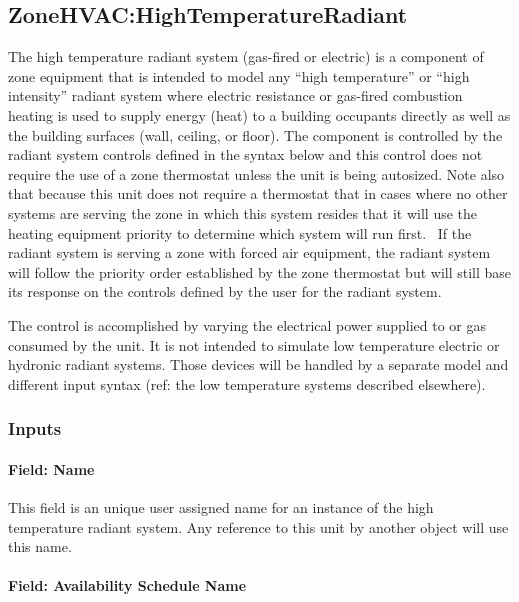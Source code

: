 \subsection{ZoneHVAC:HighTemperatureRadiant}\label{zonehvachightemperatureradiant}

The high temperature radiant system (gas-fired or electric) is a component of zone equipment that is intended to model any ``high temperature'' or ``high intensity'' radiant system where electric resistance or gas-fired combustion heating is used to supply energy (heat) to a building occupants directly as well as the building surfaces (wall, ceiling, or floor). The component is controlled by the radiant system controls defined in the syntax below and this control does not require the use of a zone thermostat unless the unit is being autosized. Note also that because this unit does not require a thermostat that in cases where no other systems are serving the zone in which this system resides that it will use the heating equipment priority to determine which system will run first.~ If the radiant system is serving a zone with forced air equipment, the radiant system will follow the priority order established by the zone thermostat but will still base its response on the controls defined by the user for the radiant system.

The control is accomplished by varying the electrical power supplied to or gas consumed by the unit. It is not intended to simulate low temperature electric or hydronic radiant systems. Those devices will be handled by a separate model and different input syntax (ref: the low temperature systems described elsewhere).

\subsubsection{Inputs}\label{inputs-9-015}

\paragraph{Field: Name}\label{field-name-9-013}

This field is an unique user assigned name for an instance of the high temperature radiant system. Any reference to this unit by another object will use this name.

\paragraph{Field: Availability Schedule Name}\label{field-availability-schedule-name-8-003}

